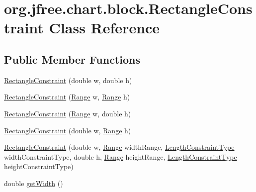 \hypertarget{classorg_1_1jfree_1_1chart_1_1block_1_1_rectangle_constraint}{}\section{org.\+jfree.\+chart.\+block.\+Rectangle\+Constraint Class Reference}
\label{classorg_1_1jfree_1_1chart_1_1block_1_1_rectangle_constraint}
\subsection*{Public Member Functions}
\begin{DoxyCompactItemize}
\item 
\mbox{\hyperlink{classorg_1_1jfree_1_1chart_1_1block_1_1_rectangle_constraint_af72e3b34ff39c2e1cb2873a41622bada}{Rectangle\+Constraint}} (double w, double h)
\item 
\mbox{\hyperlink{classorg_1_1jfree_1_1chart_1_1block_1_1_rectangle_constraint_a18ee078842c35c1a37cb0907b3b9e348}{Rectangle\+Constraint}} (\mbox{\hyperlink{classorg_1_1jfree_1_1data_1_1_range}{Range}} w, \mbox{\hyperlink{classorg_1_1jfree_1_1data_1_1_range}{Range}} h)
\item 
\mbox{\hyperlink{classorg_1_1jfree_1_1chart_1_1block_1_1_rectangle_constraint_a9711823936c9cc8f8a72b9e832be0de4}{Rectangle\+Constraint}} (\mbox{\hyperlink{classorg_1_1jfree_1_1data_1_1_range}{Range}} w, double h)
\item 
\mbox{\hyperlink{classorg_1_1jfree_1_1chart_1_1block_1_1_rectangle_constraint_a329cc837a390b6f781ca0ce06fc82a70}{Rectangle\+Constraint}} (double w, \mbox{\hyperlink{classorg_1_1jfree_1_1data_1_1_range}{Range}} h)
\item 
\mbox{\hyperlink{classorg_1_1jfree_1_1chart_1_1block_1_1_rectangle_constraint_a27d27c7e054e87e056d02e61e9e34815}{Rectangle\+Constraint}} (double w, \mbox{\hyperlink{classorg_1_1jfree_1_1data_1_1_range}{Range}} width\+Range, \mbox{\hyperlink{classorg_1_1jfree_1_1chart_1_1block_1_1_length_constraint_type}{Length\+Constraint\+Type}} width\+Constraint\+Type, double h, \mbox{\hyperlink{classorg_1_1jfree_1_1data_1_1_range}{Range}} height\+Range, \mbox{\hyperlink{classorg_1_1jfree_1_1chart_1_1block_1_1_length_constraint_type}{Length\+Constraint\+Type}} height\+Constraint\+Type)
\item 
double \mbox{\hyperlink{classorg_1_1jfree_1_1chart_1_1block_1_1_rectangle_constraint_a081d7562496c477c63ffbd1ec552fe0d}{get\+Width}} ()

\end{DoxyCompactItemize}
